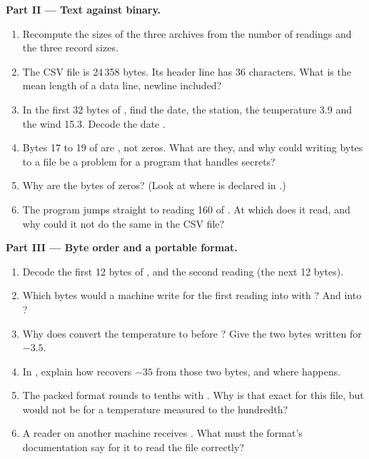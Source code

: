 \begin{problem}
\medskip\noindent\textbf{Part II --- Text against binary.}
\begin{enumerate}[resume]
\item Recompute the sizes of the three archives from the number of readings and the three record sizes.
\item The CSV file is 24\,358 bytes. Its header line has 36 characters. What is the mean length of a data line,
newline included?
\item In the first 32 bytes of , find the date, the station, the temperature 3.9 and the wind 15.3.
Decode the date .
\item Bytes 17 to 19 of  are , not zeros. What are they, and why could writing 
bytes to a file be a problem for a program that handles secrets?
\item Why are the  bytes of  zeros? (Look at where  is declared in
.)
\item The program jumps straight to reading 160 of . At which  does it read, and why
could it not do the same in the CSV file?
\end{enumerate}

\medskip\noindent\textbf{Part III --- Byte order and a portable format.}
\begin{enumerate}[resume]
\item Decode the first 12 bytes of , and the second reading (the next 12 bytes).
\item Which bytes would a  machine write for the first reading into  with ? And
into ?
\item Why does  convert the temperature to  before ? Give the two bytes
written for $-3.5$.
\item In , explain how  recovers $-35$ from those two bytes, and
where  happens.
\item The packed format rounds to tenths with . Why is that exact for this file, but would not be for a
temperature measured to the hundredth?
\item A reader on another machine receives . What must the format's documentation say for it to read
the file correctly?
\end{enumerate}


\end{problem}
